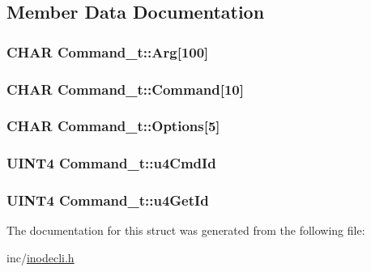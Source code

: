 \subsection{Member Data Documentation}
\hypertarget{structCommand__t_a6f5c12b905882fb8c3e75001895fdba8}{
\subsubsection[{Arg}]{\setlength{\rightskip}{0pt plus 5cm}C\+H\+A\+R Command\+\_\+t\+::\+Arg\mbox{[}100\mbox{]}}}\label{structCommand__t_a6f5c12b905882fb8c3e75001895fdba8}
\hypertarget{structCommand__t_a78320e9f061009774a25879ff29727b7}{
\subsubsection[{Command}]{\setlength{\rightskip}{0pt plus 5cm}C\+H\+A\+R Command\+\_\+t\+::\+Command\mbox{[}10\mbox{]}}}\label{structCommand__t_a78320e9f061009774a25879ff29727b7}
\hypertarget{structCommand__t_a7a930bcd047b7ed2d5fe372cb9400003}{
\subsubsection[{Options}]{\setlength{\rightskip}{0pt plus 5cm}C\+H\+A\+R Command\+\_\+t\+::\+Options\mbox{[}5\mbox{]}}}\label{structCommand__t_a7a930bcd047b7ed2d5fe372cb9400003}
\hypertarget{structCommand__t_aeadb3c458b96a4a0622e5093eea58f54}{
\subsubsection[{u4\+Cmd\+Id}]{\setlength{\rightskip}{0pt plus 5cm}U\+I\+N\+T4 Command\+\_\+t\+::u4\+Cmd\+Id}}\label{structCommand__t_aeadb3c458b96a4a0622e5093eea58f54}
\hypertarget{structCommand__t_aaef7e79094d7a357b0dc8db61e7d4e3b}{
\subsubsection[{u4\+Get\+Id}]{\setlength{\rightskip}{0pt plus 5cm}U\+I\+N\+T4 Command\+\_\+t\+::u4\+Get\+Id}}\label{structCommand__t_aaef7e79094d7a357b0dc8db61e7d4e3b}


The documentation for this struct was generated from the following file\+:\begin{DoxyCompactItemize}
\item 
inc/\hyperlink{inodecli_8h}{inodecli.\+h}\end{DoxyCompactItemize}
